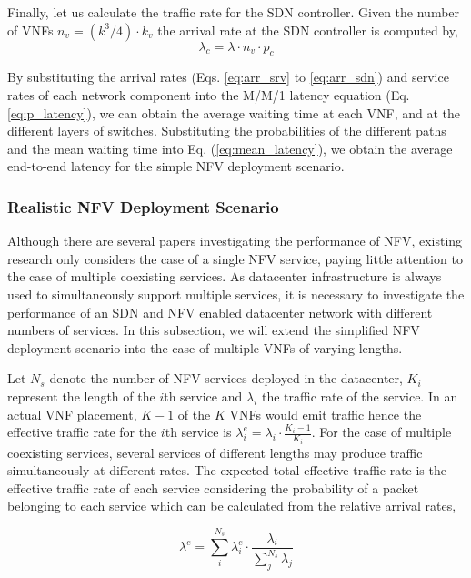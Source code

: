 Finally, let us calculate the traffic rate for the SDN controller. Given the number of VNFs $n_v = (k^3 / 4) \cdot k_v$ the arrival rate at the SDN controller is computed by,
\begin{equation}
    \label{eq:arr_sdn}
    \lambda_c = \lambda \cdot n_v \cdot p_c
\end{equation}

By substituting the arrival rates (Eqs. \ref{eq:arr_srv} to \ref{eq:arr_sdn}) and service rates of each network component into the M/M/1 latency equation (Eq. \ref{eq:p_latency}), we can obtain the average waiting time at each VNF, and at the different layers of switches. Substituting the probabilities of the different paths and the mean waiting time into Eq. (\ref{eq:mean_latency}), we obtain the average end-to-end latency for the simple NFV deployment scenario.

\subsubsection{Realistic NFV Deployment Scenario}
\label{sec:realistic}

Although there are several papers investigating the performance of NFV, existing research only considers the case of a single NFV service, paying little attention to the case of multiple coexisting services. As datacenter infrastructure is always used to simultaneously support multiple services, it is necessary to investigate the performance of an SDN and NFV enabled datacenter network with different numbers of services. In this subsection, we will extend the simplified NFV deployment scenario into the case of multiple VNFs of varying lengths.

Let $N_s$ denote the number of NFV services deployed in the datacenter, $K_i$ represent the length of the $i$th service and $\lambda_i$ the traffic rate of the service. In an actual VNF placement, $K-1$ of the $K$ VNFs would emit traffic hence the effective traffic rate for the $i$th service is $\lambda_{i}^{e} = \lambda_{i} \cdot \frac{K_i-1}{K_i}$. For the case of multiple coexisting services, several services of different lengths may produce traffic simultaneously at different rates. The expected total effective traffic rate is the effective traffic rate of each service considering the probability of a packet belonging to each service which can be calculated from the relative arrival rates,

\begin{equation}
    \label{eq:effective_arrival}
    \lambda^e = \sum_i^{N_s} \lambda_i^e \cdot \frac{\lambda_i}{\sum_j^{N_s} \lambda_j}
\end{equation}

